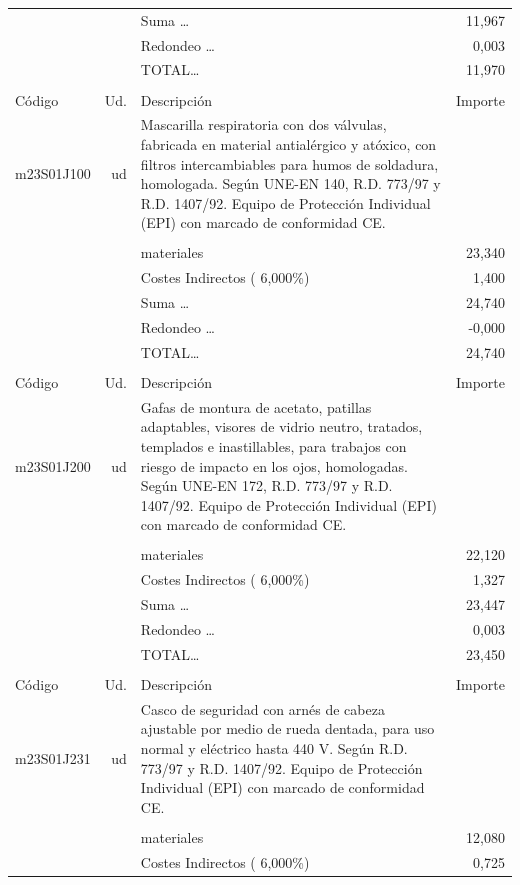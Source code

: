 \documentclass{book}%
\begin{document}
\begin{supertabular}{l r p{60mm} r}
&&Suma \ldots&    11,967\\%
&&Redondeo \ldots&     0,003\\%
%
&&TOTAL\ldots&    11,970\\%
&&&\\%
Código&Ud.&Descripción&Importe\\%
\hline%
m23S01J100&ud&Mascarilla respiratoria con dos válvulas, fabricada en material antialérgico y atóxico, con filtros intercambiables para humos de soldadura, homologada. Según UNE{-}EN 140, R.D. 773/97 y R.D. 1407/92. Equipo de Protección Individual (EPI) con marcado de conformidad CE.&\\%
&&&\\%
&&materiales&    23,340\\%
&&Costes Indirectos (     6,000\%)&     1,400\\%
&&Suma \ldots&    24,740\\%
&&Redondeo \ldots&    {-}0,000\\%
%
&&TOTAL\ldots&    24,740\\%
&&&\\%
Código&Ud.&Descripción&Importe\\%
\hline%
m23S01J200&ud&Gafas de montura de acetato, patillas adaptables, visores de vidrio neutro, tratados, templados e inastillables, para trabajos con riesgo de impacto en los ojos, homologadas. Según UNE{-}EN 172, R.D. 773/97 y R.D. 1407/92. Equipo de Protección Individual (EPI) con marcado de conformidad CE.&\\%
&&&\\%
&&materiales&    22,120\\%
&&Costes Indirectos (     6,000\%)&     1,327\\%
&&Suma \ldots&    23,447\\%
&&Redondeo \ldots&     0,003\\%
%
&&TOTAL\ldots&    23,450\\%
&&&\\%
Código&Ud.&Descripción&Importe\\%
\hline%
m23S01J231&ud&Casco de seguridad con arnés de cabeza ajustable por medio de rueda dentada, para uso normal y eléctrico hasta 440 V. Según R.D. 773/97 y R.D. 1407/92. Equipo de Protección Individual (EPI) con marcado de conformidad CE.&\\%
&&&\\%
&&materiales&    12,080\\%
&&Costes Indirectos (     6,000\%)&     0,725\\%

\end{supertabular}
\end{document}
